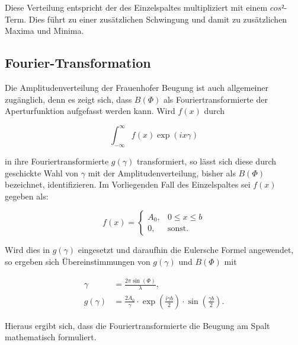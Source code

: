 Diese Verteilung entspricht der des Einzelspaltes multipliziert mit einem $cos²$-Term. Dies führt zu einer zusätzlichen 
Schwingung und damit zu zusätzlichen Maxima und Minima. 

\subsection{Fourier-Transformation}

Die Amplitudenverteilung der Frauenhofer Beugung ist auch allgemeiner zugänglich, denn es zeigt sich, 
dass $B(\Phi)$ als Fouriertransformierte der Aperturfunktion aufgefasst werden kann. Wird $f(x)$ durch 

\begin{equation*}
\int_{-\infty}^{\infty} f(x) \exp{\left(ix\gamma\right)}
\end{equation*}

in ihre Fouriertransformierte $g(\gamma)$ transformiert, so lässt sich diese durch geschickte Wahl von 
$\gamma$ mit der Amplitudenverteilung, bisher als $B(\Phi)$ bezeichnet, identifizieren. Im Vorliegenden 
Fall des Einzelspaltes sei $f(x)$ gegeben als:

\begin{equation*}
f(x) = 
\begin{cases}
A_0, & 0 \le x \le b\\
0  , & \text{sonst} .
\end{cases}
\end{equation*}

Wird dies in $g(\gamma)$ eingesetzt und daraufhin die Eulersche Formel angewendet, so ergeben sich Übereinstimmungen
von $g(\gamma)$ und $B(\Phi)$ mit 

\begin{align*}
\gamma &= \frac{2\pi\sin{(\Phi)}}{\lambda},\\
g(\gamma) &= \frac{2 A_0}{\gamma} \cdot \exp{\left(\frac{i\gamma b}{2}\right)}\cdot \sin{\left(\frac{\gamma b}{2}\right)}.
\end{align*}

Hieraus ergibt sich, dass die Fouriertransformierte die Beugung am Spalt mathematisch formuliert. 

